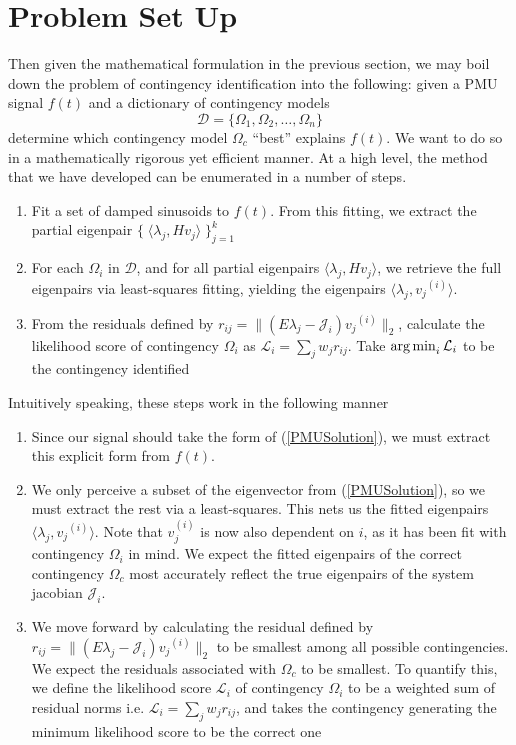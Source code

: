 \section{Problem Set Up}
Then given the mathematical formulation in the previous section, we may boil down the problem of contingency identification into the following: given a PMU signal $f(t)$ and a dictionary of contingency models
$$ \mathcal{D} =  \{ \Omega_1, \Omega_2, \dots, \Omega_n \} $$
determine which contingency model $\Omega_c$ ``best'' explains $f(t)$. We want to do so in a mathematically rigorous yet efficient manner. At a high level, the method that we have developed can be enumerated in a number of steps. 
\begin{enumerate}
    \item Fit a set of damped sinusoids to $f(t)$. From this fitting, we extract the partial eigenpair $ \{ \; \langle { \lambda_j}, {Hv_j} \rangle \; \}_{j=1}^k$
    \item For each $\Omega_i$ in $\mathcal{D}$, and for all partial eigenpairs $ \langle {\lambda_j}, {Hv_j} \rangle$, we retrieve the full eigenpairs via least-squares fitting, yielding the eigenpairs $\langle {\lambda_j}, {v_j}^{(i)} \rangle$. 
    \item From the residuals defined by $r_{ij} = \| (E{\lambda_j}-\mathcal{J}_i){v_j}^{(i)} \|_2$, calculate the likelihood score of contingency $\Omega_i$ as $\mathcal{L}_{i} = \sum_j  w_jr_{ij}$.
    Take $\operatorname*{arg\,min}_i \mathcal{L}_i$ to be the contingency identified 
\end{enumerate}

Intuitively speaking, these steps work in the following manner
\begin{enumerate}
    \item Since our signal should take the form of (\ref{PMUSolution}), we must extract this explicit form from $f(t)$. 
    \item We only perceive a subset of the eigenvector from (\ref{PMUSolution}), so we must extract the rest via a least-squares. This nets us the fitted eigenpairs $\langle {\lambda_j}, {v_j}^{(i)} \rangle $. Note that $v_j^{(i)}$ is now also dependent on $i$, as it has been fit with contingency $\Omega_i$ in mind. We expect the fitted eigenpairs of the correct contingency $\Omega_c$ most accurately reflect the true eigenpairs of the system jacobian $\mathcal{J}_i$. 
    \item We move forward by calculating the residual defined by $r_{ij} = \| (E{\lambda_j}-\mathcal{J}_i){v_j}^{(i)} \|_2$ to be smallest among all possible contingencies. We expect the residuals associated with $\Omega_c$ to be smallest. To quantify this, we define the likelihood score $\mathcal{L}_i$ of contingency $\Omega_i$ to be a weighted sum of residual norms i.e. $\mathcal{L}_{i} = \sum_j  w_jr_{ij}$, and takes the contingency generating the minimum likelihood score to be the correct one
\end{enumerate}

